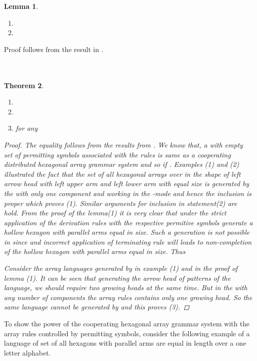 \documentclass[11pt]{article}
\newtheorem{theorem}{Theorem}[section]
\newtheorem{lemma}[theorem]{Lemma}
\begin{document}
\begin{lemma}
\begin{enumerate}
\item  \item 
\end{enumerate}
\end{lemma}
Proof follows from the result in \cite{8}.
\\\\\\
\begin{theorem}
\begin{enumerate}
\item  \item
 \item  for any 
\end{enumerate}
\begin{proof}
The equality follows from the results from \cite{8}. We know that,
a  with empty set of permitting symbols associated with
the rules is same as a cooperating distributed  hexagonal
array grammar system and so  if
. Examples (1) and (2) illustrated the fact that the set
 of all hexagonal arrays over  in the shape of left
arrow head with left upper arm and left lower arm with equal size
is generated by the  with only one component and
working in the -mode and hence the inclusion is proper which
proves (1). Similar arguments for inclusion in statement(2) are
hold. From the proof of the lemma(1) it is very clear that under
the strict application of the derivation rules with the respective
permitive symbols generate a hollow hexagon with parallel arms
equal in size. Such a generation is not possible in  since   and incorrect application of
terminating rule will leads to non-completion of the hollow
hexagon with parallel arms equal in size. Thus 

Consider the array languages generated by  in example
(1) and in the proof of lemma (1). It can be seen that generating
the arrow head of patterns of the language, we should require two
growing heads at the same time. But in the  with any
number of components the array rules contains only one growing
head. So the same language cannot be generated by
 and this proves (3).
\end{proof}
\end{theorem}
To show the power of the cooperating hexagonal array grammar system with the array rules controlled by permitting symbols, consider the following example of a language of set of all hexagons with parallel arms are equal in length over a one letter alphabet.
\end{document}
